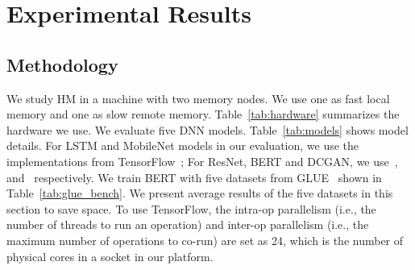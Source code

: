 \section{Experimental Results}
\subsection{Methodology}






We study HM in a machine with two memory nodes. We use one as fast local memory and one as slow remote memory. Table~\ref{tab:hardware} summarizes the hardware we use. We evaluate five DNN models.
Table~\ref{tab:models} shows model details. For %
LSTM and MobileNet models in our evaluation, we use the implementations from TensorFlow~\cite{tf_models}; For ResNet, BERT and DCGAN, we use~\cite{resnet_32}, ~\cite{bert_github} and~\cite{dcgan} respectively. 
We train BERT with five datasets from GLUE~\cite{wang-etal-2018-glue}  shown in Table~\ref{tab:glue_bench}. \textcolor{check}{We present average results of the five datasets in this section to save space}. To use TensorFlow, the intra-op parallelism (i.e., the number of threads to run an operation) and inter-op parallelism (i.e., the maximum number of operations to co-run) are set as 24, which is the number of physical cores in a socket in our platform. 

